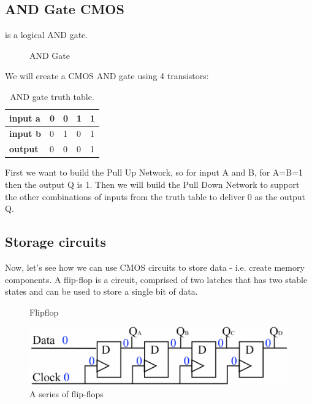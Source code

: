 \subsection{AND Gate CMOS}

 is a logical AND gate.

\begin{figure}[!ht]
    \centering
    
    \caption{AND Gate} \label{fig:and}
\end{figure}

We will create a CMOS AND gate using 4 transistors:

\begin{table}[!ht]
    \centering
    \caption{AND gate truth table.}
    \begin{tabular}{lllll}
        \toprule
        \textbf{input a} & 0 & 0 & 1 & 1 \\ \midrule \textbf{input b} & 0 & 1 &
        0 & 1 \\ \midrule \textbf{output}  & 0 & 0 & 0 & 1 \\ \bottomrule
    \end{tabular}
\end{table}

First we want to build the Pull Up Network, so for input A and B, for A=B=1 then
the output Q is 1. Then we will build the Pull Down Network to support the other
combinations of inputs from the truth table to deliver 0 as the output Q.

\subsection{Storage circuits}
Now, let's see how we can use CMOS circuits to store data - i.e. create memory components.
A flip-flop is a circuit, comprised of two latches that has two stable states and can be used to store a single bit of data.
\begin{figure}[!ht]
    \centering
    
    \caption{Flipflop} \label{fig:flipflop}
\end{figure}

\begin{figure}[!ht]
	\centering
	\includegraphics[width=1.0\textwidth]{images/banch_of_flipflops.png}
	\caption{A series of flip-flops} \label{fig:banch_of_flipflops}
\end{figure}

